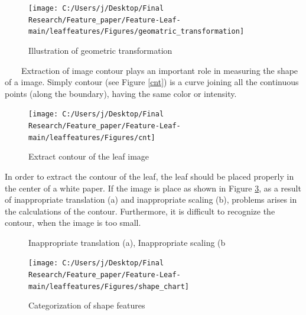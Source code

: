 \documentclass{article}
\begin{document}
\begin{figure}[!ht]

{\centering \texttt{[image: C:/Users/j/Desktop/Final Research/Feature\_paper/Feature-Leaf-main/leaffeatures/Figures/geomatric\_transformation]} 

}

\caption{\label{img3} Illustration of geometric transformation}\label{fig:unnamed-chunk-11}
\end{figure}

~~~~Extraction of image contour plays an important role in measuring the
shape of a image. Simply contour (see Figure \ref{cnt}) is a curve
joining all the continuous points (along the boundary), having the same
color or intensity.

\begin{figure}[!ht]

{\centering \texttt{[image: C:/Users/j/Desktop/Final Research/Feature\_paper/Feature-Leaf-main/leaffeatures/Figures/cnt]} 

}

\caption{\label{cnt}Extract contour of the leaf image}\label{fig:unnamed-chunk-12}
\end{figure}

In order to extract the contour of the leaf, the leaf should be placed
properly in the center of a white paper. If the image is place as shown
in Figure \ref{fig:trans}, as a result of inappropriate translation (a)
and inappropriate scaling (b), problems arises in the calculations of
the contour. Furthermore, it is difficult to recognize the contour, when
the image is too small.

\begin{figure}[!ht]

{\centering {}

}

\caption{\label{trans}Inappropriate translation (a),  Inappropriate scaling (b}\label{fig:trans}
\end{figure}

\begin{figure}[!ht]

{\centering \texttt{[image: C:/Users/j/Desktop/Final Research/Feature\_paper/Feature-Leaf-main/leaffeatures/Figures/shape\_chart]} 

}

\caption{\label{scalimg4}Categorization of shape features}\label{fig:unnamed-chunk-13}
\end{figure}
\end{document}
